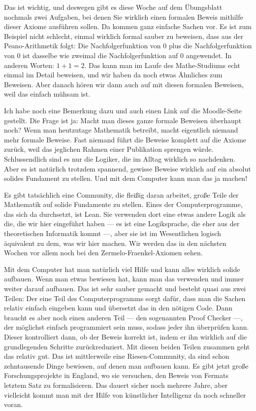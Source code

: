 \begin{spoken-clean}[00:16:30 - 00:19:44]
Das ist wichtig, und deswegen gibt es diese Woche auf dem Übungsblatt nochmals zwei Aufgaben, bei denen Sie wirklich einen formalen Beweis mithilfe dieser Axiome ausführen sollen. Da kommen ganz einfache Sachen vor. Es ist zum Beispiel nicht schlecht, einmal wirklich formal sauber zu beweisen, dass aus der Peano-Arithmetik folgt: Die Nachfolgerfunktion von $0$ plus die Nachfolgerfunktion von $0$ ist dasselbe wie zweimal die Nachfolgerfunktion auf $0$ angewendet. In anderen Worten: $1 + 1 = 2$. Das kann man im Laufe des Mathe-Studiums echt einmal im Detail beweisen, und wir haben da noch etwas Ähnliches zum Beweisen. Aber danach hören wir dann auch auf mit diesen formalen Beweisen, weil das einfach mühsam ist.

Ich habe noch eine Bemerkung dazu und auch einen Link auf die Moodle-Seite gestellt. Die Frage ist ja: Macht man dieses ganze formale Beweisen überhaupt noch? Wenn man heutzutage Mathematik betreibt, macht eigentlich niemand mehr formale Beweise. Fast niemand führt die Beweise komplett auf die Axiome zurück, weil das jeglichen Rahmen einer Publikation sprengen würde. Schlussendlich sind es nur die Logiker, die im Alltag wirklich so nachdenken. Aber es ist natürlich trotzdem spannend, gewisse Beweise wirklich auf ein absolut solides Fundament zu stellen. Und mit dem Computer kann man das ja machen!

Es gibt tatsächlich eine Community, die fleißig daran arbeitet, große Teile der Mathematik auf solide Fundamente zu stellen. Eines der Computerprogramme, das sich da durchsetzt, ist Lean. Sie verwenden dort eine etwas andere Logik als die, die wir hier eingeführt haben --- es ist eine Logiksprache, die eher aus der theoretischen Informatik kommt ---, aber sie ist im Wesentlichen logisch äquivalent zu dem, was wir hier machen. Wir werden das in den nächsten Wochen vor allem noch bei den Zermelo-Fraenkel-Axiomen sehen.

Mit dem Computer hat man natürlich viel Hilfe und kann alles wirklich solide aufbauen. Wenn man etwas bewiesen hat, kann man das verwenden und immer weiter darauf aufbauen. Das ist sehr sauber gemacht und besteht quasi aus zwei Teilen: Der eine Teil des Computerprogramms sorgt dafür, dass man die Sachen relativ einfach eingeben kann und übersetzt das in den nötigen Code. Dann braucht es aber noch einen anderen Teil --- den sogenannten Proof Checker ---, der möglichst einfach programmiert sein muss, sodass jeder ihn überprüfen kann. Dieser kontrolliert dann, ob der Beweis korrekt ist, indem er ihn wirklich auf die grundlegenden Schritte zurückreduziert. Mit diesen beiden Teilen zusammen geht das relativ gut. Das ist mittlerweile eine Riesen-Community, da sind schon zehntausende Dinge bewiesen, auf denen man aufbauen kann. Es gibt jetzt große Forschungsprojekte in England, wo sie versuchen, den Beweis von Fermats letztem Satz zu formalisieren. Das dauert sicher noch mehrere Jahre, aber vielleicht kommt man mit der Hilfe von künstlicher Intelligenz da noch schneller voran.


\end{spoken-clean}
